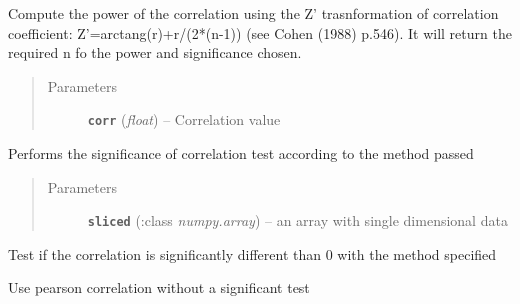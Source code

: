 \documentclass[letterpaper,10pt,english]{sphinxmanual}
\begin{document}
\begin{fulllineitems}
\begin{fulllineitems}
\end{fulllineitems}


\begin{fulllineitems}
\label{Doc:Moduler.GMstats.Power_r}
Compute the power of the correlation using the Z' trasnformation of correlation coefficient:
Z'=arctang(r)+r/(2*(n-1)) (see Cohen (1988) p.546). 
It will return the required n fo the power and significance chosen.
\begin{quote}\begin{description}
\item[{Parameters}] \leavevmode
\textbf{\texttt{corr}} (\emph{float}) -- Correlation value

\end{description}\end{quote}

\end{fulllineitems}


\begin{fulllineitems}
\label{Doc:Moduler.GMstats.SigCorrOneMatrix}
Performs the significance of correlation test according to the method passed
\begin{quote}\begin{description}
\item[{Parameters}] \leavevmode
\textbf{\texttt{sliced}} (:class \emph{numpy.array}) -- an array with single dimensional data

\end{description}\end{quote}

\end{fulllineitems}


\begin{fulllineitems}
\label{Doc:Moduler.GMstats.Sigcorr}
Test if the correlation is significantly different than 0 with the method specified

\end{fulllineitems}


\begin{fulllineitems}
\label{Doc:Moduler.GMstats.UseCorr}
Use pearson correlation without a significant test


\end{fulllineitems}
\end{fulllineitems}
\end{document}
